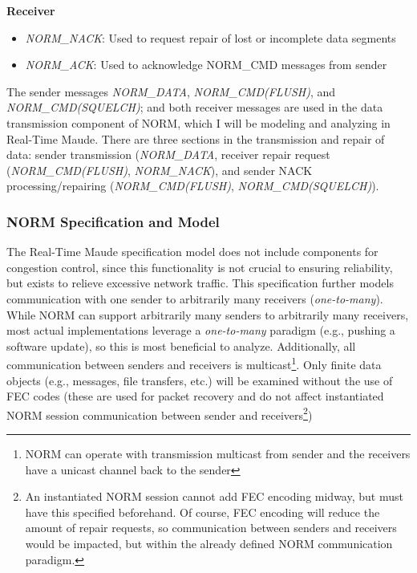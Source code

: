 \documentclass[10pt, journal]{IEEEtran}
\begin{document}
\textbf{Receiver}
\begin{itemize}
	\item \textit{NORM\_NACK}: Used to request repair of lost or incomplete data segments
	\item \textit{NORM\_ACK}: Used to acknowledge NORM\_CMD messages from sender
\end{itemize}

The sender messages \textit{NORM\_DATA}, \textit{NORM\_CMD(FLUSH)}, and \textit{NORM\_CMD(SQUELCH)}; and both receiver messages are used in the data transmission component of NORM, which I will be modeling and analyzing in Real-Time Maude. There are three sections in the transmission and repair of data: sender transmission (\textit{NORM\_DATA}, receiver repair request (\textit{NORM\_CMD(FLUSH)}, \textit{NORM\_NACK}), and sender NACK processing/repairing (\textit{NORM\_CMD(FLUSH)}, \textit{NORM\_CMD(SQUELCH)}).

\subsubsection{NORM Specification and Model}
The Real-Time Maude specification model does not include components for congestion control, since this functionality is not crucial to ensuring reliability, but exists to relieve excessive network traffic. This specification further models communication with one sender to arbitrarily many receivers (\textit{one-to-many}). While NORM can support arbitrarily many senders to arbitrarily many receivers, most actual implementations leverage a \textit{one-to-many} paradigm (e.g., pushing a software update), so this is most beneficial to analyze. Additionally, all communication between senders and receivers is multicast\footnote{NORM can operate with transmission multicast from sender and the receivers have a unicast channel back to the sender}. Only finite data objects (e.g., messages, file transfers, etc.) will be examined without the use of FEC codes (these are used for packet recovery and do not affect instantiated NORM session communication between sender and receivers\footnote{An instantiated NORM session cannot add FEC encoding midway, but must have this specified beforehand. Of course, FEC encoding will reduce the amount of repair requests, so communication between senders and receivers would be impacted, but within the already defined NORM communication paradigm.})
\end{document}
